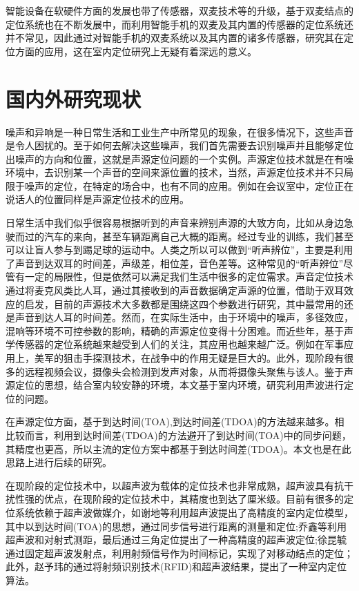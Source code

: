 \documentclass[winfonts]{njuthesis}
\begin{document}
		智能设备在软硬件方面的发展也带了传感器，双麦技术等的升级，基于双麦结点的定位系统也在不断发展中，而利用智能手机的双麦及其内置的传感器的定位系统还并不常见，因此通过对智能手机的双麦系统以及其内置的诸多传感器，研究其在定位方面的应用，这在室内定位研究上无疑有着深远的意义。
				
	\section{国内外研究现状}
	
		噪声和异响是一种日常生活和工业生产中所常见的现象，在很多情况下，这些声音是令人困扰的。至于如何去解决这些噪声，我们首先需要去识别噪声并且能够定位出噪声的方向和位置，这就是声源定位问题的一个实例。声源定位技术就是在有噪环境中，去识别某一个声音的空间来源位置的技术，当然，声源定位技术并不只局限于噪声的定位，在特定的场合中，也有不同的应用。例如在会议室中，定位正在说话人的位置同样是声源定位技术的应用。
		
		日常生活中我们似乎很容易根据听到的声音来辨别声源的大致方向，比如从身边急驶而过的汽车的来向，甚至车辆距离自己大概的距离。经过专业的训练，我们甚至可以让盲人参与到踢足球的运动中。人类之所以可以做到“听声辨位”，主要是利用了声音到达双耳的时间差，声级差，相位差，音色差等。这种常见的“听声辨位”尽管有一定的局限性，但是依然可以满足我们生活中很多的定位需求。声音定位技术通过将麦克风类比人耳，通过其接收到的声音数据确定声源的位置，借助于双耳效应的启发，目前的声源技术大多数都是围绕这四个参数进行研究，其中最常用的还是声音到达人耳的时间差。然而，在实际生活中，由于环境中的噪声，多径效应，混响等环境不可控参数的影响，精确的声源定位变得十分困难。而近些年，基于声学传感器的定位系统越来越受到人们的关注，其应用也越来越广泛。例如在军事应用上，美军的狙击手探测技术，在战争中的作用无疑是巨大的。此外，现阶段有很多的远程视频会议，摄像头会检测到发声对象，从而将摄像头聚焦与该人。鉴于声源定位的思想，结合室内较安静的环境，本文基于室内环境，研究利用声波进行定位的问题。
		
		在声源定位方面，基于到达时间(TOA),到达时间差(TDOA)的方法越来越多。相比较而言，利用到达时间差(TDOA)的方法避开了到达时间(TOA)中的同步问题，其精度也更高，所以主流的定位方案中都基于到达时间差(TDOA)。本文也是在此思路上进行后续的研究。
		
		在现阶段的定位技术中，以超声波为载体的定位技术也非常成熟，超声波具有抗干扰性强的优点，在现阶段的定位技术中，其精度也到达了厘米级。目前有很多的定位系统依赖于超声波做媒介，如谢地等\cite{xiedi}利用超声波提出了高精度的室内定位模型，其中以到达时间(TOA)的思想，通过同步信号进行距离的测量和定位;乔鑫等\cite{qiaoxin}利用超声波和对射式测距，最后通过三角定位提出了一种高精度的超声波定位;徐昆毓\cite{xukunyu}通过固定超声波发射点，利用射频信号作为时间标记，实现了对移动结点的定位；此外，赵予玮\cite{zhaoyuwei}的通过将射频识别技术(RFID)和超声波结果，提出了一种室内定位算法。
		
\end{document}
